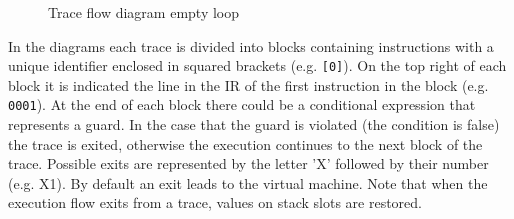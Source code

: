 \begin{figure}[H]
\hspace*{3cm}
\vspace*{-2.5cm}
\caption{Trace flow diagram empty loop}
\label{fig:trace-empty}
\end{figure}

\noindent
\begin{comment}
Explaining the IR in details would be to complex and tedious for the reader. Thus, from this example forward there will be a diagram that explains the execution  flows.  
\end{comment}
In the diagrams each trace is divided into blocks containing instructions with a unique identifier enclosed in squared brackets (e.g. \texttt{[0]}). On the top right of each block it is indicated the line in the IR of the first instruction in the block (e.g. \texttt{0001}). At the end of each block there could be a conditional expression that represents a guard. In the case that the guard is violated (the condition is false) the trace is exited, otherwise the execution continues to the next block of the trace. Possible exits are represented by the letter 'X' followed by their number (e.g. X1). By default an exit leads to the virtual machine. Note that when the execution flow exits from a trace, values on stack slots are restored.

